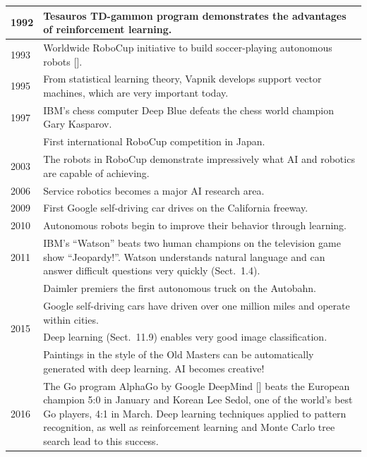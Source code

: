 \documentclass[10pt]{book}
\begin{document}
\begin{table}[htbp]
\centering
\begin{tabular}{|l|l|}
\hline
1992 & Tesauros TD-gammon program demonstrates the advantages of reinforcement learning. \\
\hline
1993 & Worldwide RoboCup initiative to build soccer-playing autonomous robots [\cite{robocupsite}]. \\
\hline
1995 & From statistical learning theory, Vapnik develops support vector machines, which are very important today. \\
\hline
1997 & IBM's chess computer Deep Blue defeats the chess world champion Gary Kasparov. \\
\hline
 & First international RoboCup competition in Japan. \\
\hline
2003 & The robots in RoboCup demonstrate impressively what AI and robotics are capable of achieving. \\
\hline
2006 & Service robotics becomes a major AI research area. \\
\hline
2009 & First Google self-driving car drives on the California freeway. \\
\hline
2010 & Autonomous robots begin to improve their behavior through learning. \\
\hline
2011 & IBM's ``Watson'' beats two human champions on the television game show ``Jeopardy!''. Watson understands natural language and can answer difficult questions very quickly (Sect.\ 1.4). \\
\hline
\multirow[t]{4}{*}{2015} & Daimler premiers the first autonomous truck on the Autobahn. \\
\cline{2-2}
 & Google self-driving cars have driven over one million miles and operate within cities. \\
\cline{2-2}
 & Deep learning (Sect.\ 11.9) enables very good image classification. \\
\cline{2-2}
 & Paintings in the style of the Old Masters can be automatically generated with deep learning. AI becomes creative! \\
\hline
2016 & The Go program AlphaGo by Google DeepMind [\cite{silver2016go}] beats the European champion 5:0 in January and Korean Lee Sedol, one of the world's best Go players, 4:1 in March. Deep learning techniques applied to pattern recognition, as well as reinforcement learning and Monte Carlo tree search lead to this success. \\
\hline
\end{tabular}
\end{table}
\end{document}
